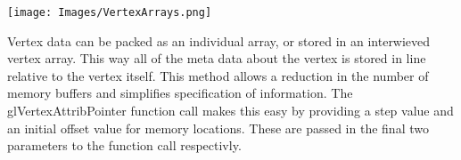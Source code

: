 \begin{center}
\texttt{[image: Images/VertexArrays.png]}
\end{center}

Vertex data can be packed as an individual array, or stored in an interwieved 
vertex array. This way all of the meta data about the vertex is stored in line 
relative to the vertex itself. This method allows a reduction in the number of 
memory buffers and simplifies specification of information. The 
glVertexAttribPointer function call makes this easy by providing a step value and
an initial offset value for memory locations. These are passed in the final two
parameters to the function call respectivly.\\



